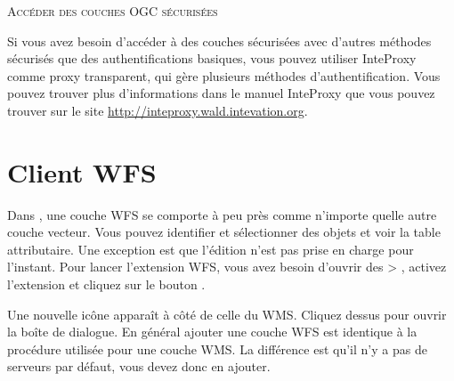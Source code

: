 \begin{Tip}[ht]\caption{\textsc{Accéder des couches OGC sécurisées}}
Si vous avez besoin d'accéder à des couches sécurisées avec d'autres méthodes sécurisés 
que des authentifications basiques, vous pouvez utiliser InteProxy comme proxy transparent, qui gère plusieurs méthodes d'authentification. Vous pouvez trouver plus d'informations dans le manuel InteProxy que vous pouvez trouver sur le site \url{http://inteproxy.wald.intevation.org}. 
\end{Tip}


\section{Client WFS}\label{sec:ogc-wfs}

Dans \qg, une couche WFS se comporte à peu près comme n'importe quelle autre
couche vecteur. Vous pouvez identifier et sélectionner des objets et
voir la table attributaire. Une exception est que l'édition n'est
pas prise en charge pour l'instant. Pour lancer l'extension WFS, vous avez besoin
d'ouvrir des  >
, activez
l'extension  et cliquez sur le bouton .

Une nouvelle icône 
apparaît à côté de celle du WMS. Cliquez dessus pour ouvrir la boîte de
dialogue. En général ajouter une couche WFS est identique à la procédure
utilisée pour une couche WMS. La différence est qu'il n'y a pas de serveurs par
défaut, vous devez donc en ajouter.

